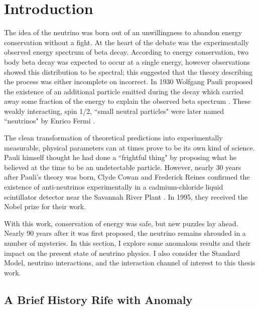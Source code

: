 \section{Introduction}
The idea of the neutrino was born out of an unwillingness to abandon energy conservation without a fight. At the heart of the debate was the experimentally observed energy spectrum of beta decay. According to energy conservation, two body beta decay was expected to occur at a single energy, however observations showed this distribution to be spectral; this suggested that the theory describing the process was either incomplete on incorrect.  In 1930 Wolfgang Pauli proposed the existence of an additional particle emitted during the decay which carried away some fraction of the energy to explain the observed beta spectrum \cite{bib:pauli}. These weakly interacting, spin 1/2, ``small neutral particles" were later named ``neutrinos" by Enrico Fermi \cite{bib:fermi}. 
\par The clean transformation of theoretical predictions into experimentally measurable, physical parameters can at times prove to be its own kind of science. Pauli himself thought he had done a ``frightful thing" by proposing what he believed at the time to be an undetectable particle. However, nearly 30 years after Pauli's theory was born, Clyde Cowan and Frederick Reines confirmed the existence of anti-neutrinos experimentally in a cadmium-chloride liquid scintillator detector near the Savannah River Plant \cite{bib:cowan}.  In 1995, they received the Nobel prize for their work.
\par With this work, conservation of energy was safe, but new puzzles lay ahead. Nearly 90 years after it was first proposed, the neutrino remains shrouded in a number of mysteries. In this section, I explore some anomalous results and their impact on the present state of neutrino physics.  I also consider the Standard Model, neutrino interactions, and the interaction channel of interest to this thesis work. 

\subsection{A Brief History Rife with Anomaly}
